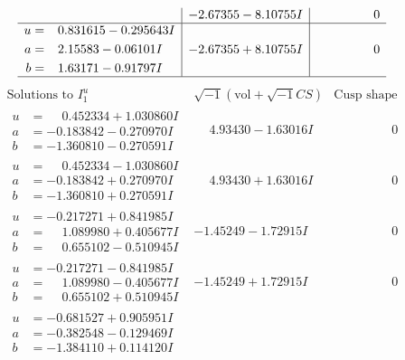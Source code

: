 \documentclass[1p]{elsarticle_modified}
\theoremstyle{definition}
\newcommand{\I}{\sqrt{-1}}
\begin{document}
$$\begin{array}{c|c|c}
 & -2.67355 - 8.10755 I & \phantom{-0.000000 } 0 \\ \hline\begin{aligned}
u &= \phantom{-}0.831615 - 0.295643 I \\
a &= \phantom{-}2.15583 - 0.06101 I \\
b &= \phantom{-}1.63171 - 0.91797 I\end{aligned}
 & -2.67355 + 8.10755 I & \phantom{-0.000000 } 0\\
 \hline 
 \end{array}$$\newpage$$\begin{array}{c|c|c}  
\text{Solutions to }I^u_{1}& \I (\text{vol} + \sqrt{-1}CS) & \text{Cusp shape}\\
 \hline 
\begin{aligned}
u &= \phantom{-}0.452334 + 1.030860 I \\
a &= -0.183842 - 0.270970 I \\
b &= -1.360810 - 0.270591 I\end{aligned}
 & \phantom{-}4.93430 - 1.63016 I & \phantom{-0.000000 } 0 \\ \hline\begin{aligned}
u &= \phantom{-}0.452334 - 1.030860 I \\
a &= -0.183842 + 0.270970 I \\
b &= -1.360810 + 0.270591 I\end{aligned}
 & \phantom{-}4.93430 + 1.63016 I & \phantom{-0.000000 } 0 \\ \hline\begin{aligned}
u &= -0.217271 + 0.841985 I \\
a &= \phantom{-}1.089980 + 0.405677 I \\
b &= \phantom{-}0.655102 - 0.510945 I\end{aligned}
 & -1.45249 - 1.72915 I & \phantom{-0.000000 } 0 \\ \hline\begin{aligned}
u &= -0.217271 - 0.841985 I \\
a &= \phantom{-}1.089980 - 0.405677 I \\
b &= \phantom{-}0.655102 + 0.510945 I\end{aligned}
 & -1.45249 + 1.72915 I & \phantom{-0.000000 } 0 \\ \hline\begin{aligned}
u &= -0.681527 + 0.905951 I \\
a &= -0.382548 - 0.129469 I \\
b &= -1.384110 + 0.114120 I\end{aligned}

\end{array}$$
\end{document}
